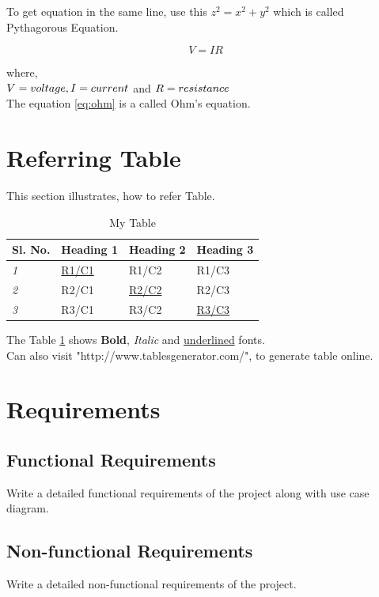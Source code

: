 To get equation in the same line, use this $ z^2 = x^2 + y^2$ which is called Pythagorous Equation.


\begin{equation} 
\label{eq:ohm}
V=IR
\end{equation}

where,\\ $V=voltage,\\ I=current $ and $\\ R=resistance $ \\
The equation \ref{eq:ohm} is a called Ohm's equation.


\section{Referring Table}
This section illustrates, how to refer Table.

\begin{table}[h]
\centering
\caption{My Table}
\label{tab:RC}
\begin{tabular}{|l|l|l|l|}
\hline
\textbf{Sl. No.} & \textbf{Heading 1} & \textbf{Heading 2} & \textbf{Heading 3} \\ \hline
\textit{1}       & { \underline{R1/C1}}        & R1/C2              & R1/C3              \\ \hline
\textit{2}       & R2/C1              & { \underline{R2/C2}}        & R2/C3              \\ \hline
\textit{3}       & R3/C1              & R3/C2              & { \underline{R3/C3}}        \\ \hline
\end{tabular}
\end{table}

The Table \ref{tab:RC} shows \textbf{Bold}, \textit{Italic} and \underline{underlined} fonts. \\
Can also visit "http://www.tablesgenerator.com/", to generate table online.

\section{Requirements}
\subsection{Functional Requirements}
Write a detailed functional requirements of the project along with use case diagram.
\subsection{Non-functional Requirements}
Write a detailed non-functional requirements of the project.

